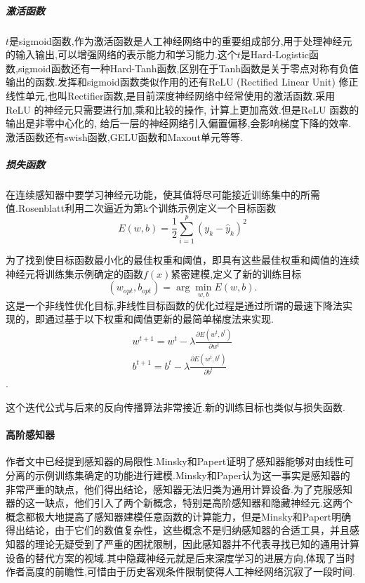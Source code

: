\subparagraph{激活函数}

$t$是sigmoid函数,作为激活函数是人工神经网络中的重要组成部分,用于处理神经元的输入输出,可以增强网络的表示能力和学习能力.这个$t$是Hard-Logistic函数,sigmoid函数还有一种Hard-Tanh函数,区别在于Tanh函数是关于零点对称有负值输出的函数.发挥和sigmoid函数类似作用的还有ReLU (Rectified Linear Unit) 修正线性单元\cite{Nair2010},也叫Rectifier函数,是目前深度神经网络中经常使用的激活函数.采用 ReLU 的神经元只需要进行加,乘和比较的操作, 计算上更加高效.但是ReLU 函数的输出是非零中心化的, 给后一层的神经网络引入偏置偏移,会影响梯度下降的效率.激活函数还有swish函数,GELU函数和Maxout单元等等.

\subparagraph{损失函数}


在连续感知器中要学习神经元功能，使其值将尽可能接近训练集中的所需值.Rosenblatt利用二次逼近为第k个训练示例定义一个目标函数
\[E(w,b) = \frac{1}{2}\sum_{i=1}^p {(y_k - \hat{y}_k)}^2\]

为了找到使目标函数最小化的最佳权重和阈值，即具有这些最佳权重和阈值的连续神经元将训练集示例确定的函数$f(x)$紧密建模,定义了新的训练目标
\[(w_{opt}, b_{opt}) = \arg \min_{w,b} E(w,b).\]
这是一个非线性优化目标,非线性目标函数的优化过程是通过所谓的最速下降法实现的，即通过基于以下权重和阈值更新的最简单梯度法来实现.
\begin{align*}
  w^{t+1} = w^t - \lambda \frac{\partial E(w^{t}, b^t)}{\partial w^t} \\
  b^{t+1} = b^t - \lambda \frac{\partial E(w^{t}, b^t)}{\partial b^t}
\end{align*}.

这个迭代公式与后来的反向传播算法非常接近.新的训练目标也类似与损失函数.

\paragraph{高阶感知器}

作者文中已经提到感知器的局限性.Minsky和Papert证明了感知器能够对由线性可分离的示例训练集确定的功能进行建模.Minsky和Paper认为这一事实是感知器的非常严重的缺点，他们得出结论，感知器无法归类为通用计算设备.为了克服感知器的这一缺点，他们引入了两个新概念，特别是高阶感知器和隐藏神经元.这两个概念都极大地提高了感知器建模任意函数的计算能力，但是Minsky和Papert明确得出结论，由于它们的数值复杂性，这些概念不是归纳感知器的合适工具，并且感知器的理论无疑受到了严重的困扰限制，因此感知器并不代表寻找已知的通用计算设备的替代方案的视域.其中隐藏神经元就是后来深度学习的进展方向,体现了当时作者高度的前瞻性,可惜由于历史客观条件限制使得人工神经网络沉寂了一段时间.

